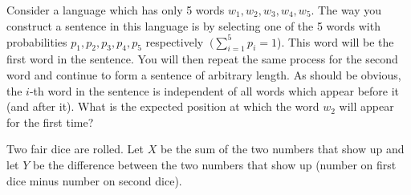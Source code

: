\documentclass[solution,addpoints,12pt]{exam}
\begin{document}
\begin{questions}

\question[1] Consider a language which has only 5 words $w_1, w_2, w_3, w_4, w_5$. The way you construct a sentence in this language is by selecting one of the 5 words with probabilities $p_1, p_2, p_3, p_4, p_5$ respectively $~(\sum_{i=1}^{5} p_i = 1$). This word will be the first word in the sentence. You will then repeat the same process for the second word and continue to form a sentence of arbitrary length. As should be obvious, the $i$-th word in the sentence is independent of all words which appear before it (and after it). What is the expected position at which the word $w_2$ will appear for the first time?
\begin{solution}
\end{solution}

\question Two fair dice are rolled. Let $X$ be the sum of the two numbers that show up and let $Y$ be the difference between the two numbers that show up (number on first dice minus number on second dice). 


\end{questions}
\end{document}
